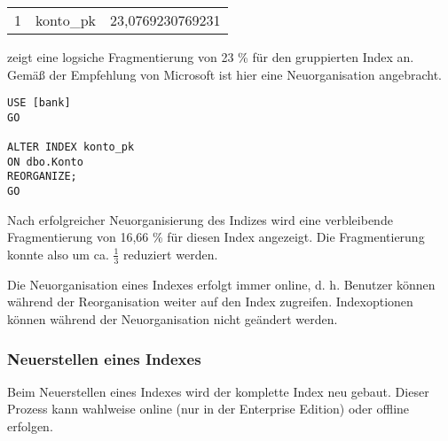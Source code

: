           \begin{center}
            \begin{small}
              \tablehead{}
              \begin{mssql}
                \begin{supertabular}{lll}
                  1 & konto\_pk & 23,0769230769231 \\
                \end{supertabular}
              \end{mssql}
            \end{small}
          \end{center}
           zeigt eine logsiche Fragmentierung von 23 \% für
          den gruppierten Index  an. Gemäß der Empfehlung
          von Microsoft ist hier eine Neuorganisation angebracht.
          \begin{lstlisting}[language=ms_sql, caption={Den Index
          \identifier{konto\_pk} reorganisieren}, label=admin05_13]
USE [bank]
GO

ALTER INDEX konto_pk
ON dbo.Konto
REORGANIZE;
GO
          \end{lstlisting}
          Nach erfolgreicher Neuorganisierung des Indizes wird eine verbleibende
          Fragmentierung von 16,66 \% für diesen Index angezeigt. Die
          Fragmentierung konnte also um ca. $\frac{1}{3}$ reduziert werden.
          \begin{merke}
            Die Neuorganisation eines Indexes erfolgt immer online, d. h.
            Benutzer können während der Reorganisation weiter auf den Index
            zugreifen. Indexoptionen können während der Neuorganisation nicht
            geändert werden.
          \end{merke}
        \subsubsection{Neuerstellen eines Indexes}
          Beim Neuerstellen eines Indexes wird der komplette Index neu gebaut.
          Dieser Prozess kann wahlweise online (nur in der Enterprise Edition)
          oder offline erfolgen.
          
